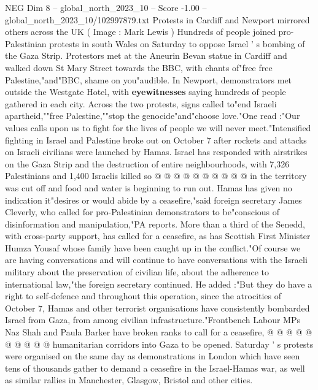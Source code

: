 \begin{textsample}{NEG Dim 8 – global\_north\_2023\_10 – Score -1.00 – global\_north\_2023\_10/102997879.txt}  \label{ex:f8_neg_218}
Protests in Cardiff and Newport mirrored others across the UK ( Image : Mark Lewis ) Hundreds of people joined pro-Palestinian protests in south Wales on Saturday to oppose Israel ' s bombing of the Gaza Strip.
Protestors met at the Aneurin Bevan statue in Cardiff and walked down St Mary Street towards the BBC, with chants of"free free Palestine,"and"BBC, shame on you"audible.
In Newport, demonstrators met outside the Westgate Hotel, with \textbf{eyewitnesses} saying hundreds of people gathered in each city.
Across the two protests, signs called to"end Israeli apartheid,""free Palestine,""stop the genocide"and"choose love."One read :"Our values calls upon us to fight for the lives of people we will never meet."Intensified fighting in Israel and Palestine broke out on October 7 after rockets and attacks on Israeli civilians were launched by Hamas.
Israel has responded with airstrikes on the Gaza Strip and the destruction of entire neighbourhoods, with 7,326 Palestinians and 1,400 Israelis killed so @ @ @ @ @ @ @ @ @ @ in the territory was cut off and food and water is beginning to run out.
Hamas has given no indication it"desires or would abide by a ceasefire,"said foreign secretary James Cleverly, who called for pro-Palestinian demonstrators to be"conscious of disinformation and manipulation,"PA reports.
More than a third of the Senedd, with cross-party support, has called for a ceasefire, as has Scottish First Minister Humza Yousaf whose family have been caught up in the conflict."Of course we are having conversations and will continue to have conversations with the Israeli military about the preservation of civilian life, about the adherence to international law,"the foreign secretary continued.
He added :"But they do have a right to self-defence and throughout this operation, since the atrocities of October 7, Hamas and other terrorist organisations have consistently bombarded Israel from Gaza, from among civilian infrastructure."Frontbench Labour MPs Naz Shah and Paula Barker have broken ranks to call for a ceasefire, @ @ @ @ @ @ @ @ @ @ humanitarian corridors into Gaza to be opened.
Saturday ' s protests were organised on the same day as demonstrations in London which have seen tens of thousands gather to demand a ceasefire in the Israel-Hamas war, as well as similar rallies in Manchester, Glasgow, Bristol and other cities.

\end{textsample}
